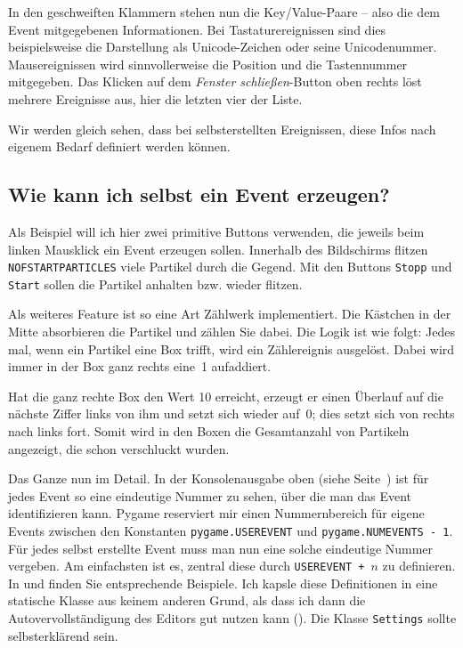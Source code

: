 In den geschweiften Klammern stehen nun die Key/Value-Paare -- also die dem Event mitgegebenen Informationen. Bei Tastaturereignissen sind dies beispielsweise die Darstellung als Unicode-Zeichen oder seine Unicodenummer. Mausereignissen wird sinnvollerweise die Position und die Tastennummer mitgegeben. Das Klicken auf dem \emph{Fenster schließen}-Button oben rechts löst mehrere Ereignisse aus, hier die letzten vier der Liste.

Wir werden gleich sehen, dass bei selbsterstellten Ereignissen, diese Infos nach eigenem Bedarf definiert werden können.

\subsection{Wie kann ich selbst ein Event erzeugen?}

Als Beispiel will ich hier zwei primitive Buttons verwenden, die jeweils beim linken Mausklick ein Event erzeugen sollen. Innerhalb des Bildschirms flitzen \texttt{NOFSTARTPARTICLES} viele Partikel durch die Gegend. Mit den Buttons \texttt{Stopp} und \texttt{Start} sollen die Partikel anhalten bzw. wieder flitzen. 


Als weiteres Feature ist so eine Art Zählwerk implementiert. Die Kästchen in der Mitte absorbieren die Partikel und zählen Sie dabei. Die Logik ist wie folgt: Jedes mal, wenn ein Partikel eine Box trifft, wird ein Zählereignis ausgelöst. Dabei wird immer in der Box ganz rechts eine~1 aufaddiert.

Hat die ganz rechte Box den Wert 10 erreicht, erzeugt er einen Überlauf auf die nächste Ziffer links von ihm und setzt sich wieder auf~0; dies setzt sich von rechts nach links fort. Somit wird in den Boxen die Gesamtanzahl von Partikeln angezeigt, die schon verschluckt wurden.

Das Ganze nun im Detail. In der Konsolenausgabe oben (siehe Seite~\pageref{srcConsole00a}) ist für jedes Event so eine eindeutige Nummer zu sehen, über die man das Event identifizieren kann. Pygame reserviert mir einen Nummernbereich für eigene Events zwischen den Konstanten \texttt{pygame.USEREVENT} und \texttt{pygame.NUMEVENTS~-~1}. Für jedes selbst erstellte Event muss man nun eine solche eindeutige Nummer vergeben. Am einfachsten ist es, zentral diese durch \texttt{USEREVENT~+~}$n$ zu definieren. In  und  finden Sie entsprechende Beispiele. Ich kapsle diese Definitionen in eine statische Klasse aus keinem anderen Grund, als dass ich dann die Autovervollständigung des Editors gut nutzen kann (). Die Klasse \texttt{Settings} sollte selbsterklärend sein.

